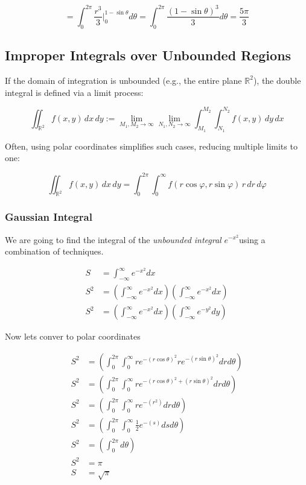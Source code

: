 \[
= \int_{0}^{2\pi}\frac{r^3}{3} |_{0}^{1 - \sin \theta} d\theta = \int_{0}^{2\pi} \frac{(1 - \sin\theta)^3}{3} d\theta = \frac{5 \pi}{3}
\]


\subsection{Improper Integrals over Unbounded Regions}

If the domain of integration is unbounded (e.g., the entire plane \( \mathbb{R}^2 \)), the double integral is defined via a limit process:

\[
\iint_{\mathbb{R}^2} f(x, y)\, dx\, dy := \lim_{M_1, M_2 \to \infty} \lim_{N_1, N_2 \to \infty}
\int_{M_1}^{M_2} \int_{N_1}^{N_2} f(x, y)\, dy\, dx
\]

Often, using polar coordinates simplifies such cases, reducing multiple limits to one:

\[
\iint_{\mathbb{R}^2} f(x, y)\, dx\, dy = \int_0^{2\pi} \int_0^{\infty} f(r \cos \varphi, r \sin \varphi)\, r\, dr\, d\varphi
\]


\subsubsection{Gaussian Integral}

We are going to find the integral of the \emph{unbounded integral} 
\(e^{-x^2}\)using a combination of techniques.

\begin{align*}
S &= \int_{-\infty}^{\infty} e^{-x^2}dx\\
S^2 &= \left(\int_{-\infty}^{\infty} e^{-x^2}dx\right) \left(\int_{-\infty}^{\infty} e^{-x^2}dx\right)\\
S^2 &= \left(\int_{-\infty}^{\infty} e^{-x^2}dx\right) \left(\int_{-\infty}^{\infty} e^{-y^2}dy\right)
\end{align*}

Now lets conver to polar coordinates

\begin{align*}
S^2 &= \left(\int_{0}^{2\pi} \int_{0}^{\infty}re^{-(r\cos\theta)^2} re^{-(r\sin\theta)^2}drd\theta\right)\\
S^2 &= \left(\int_{0}^{2\pi} \int_{0}^{\infty}re^{-(r\cos\theta)^2 + (r\sin\theta)^2}drd\theta\right)\\
S^2 &= \left(\int_{0}^{2\pi} \int_{0}^{\infty}re^{-(r^2)}drd\theta\right)\\
S^2 &=  \left(\int_{0}^{2\pi} \int_{0}^{\infty}\frac{1}{2}e^{-(s)}dsd\theta\right)\\
S^2 &= \left(\int_{0}^{2\pi}d\theta\right)\\
S^2 &= \pi\\
S   &= \sqrt{\pi}
\end{align*}

